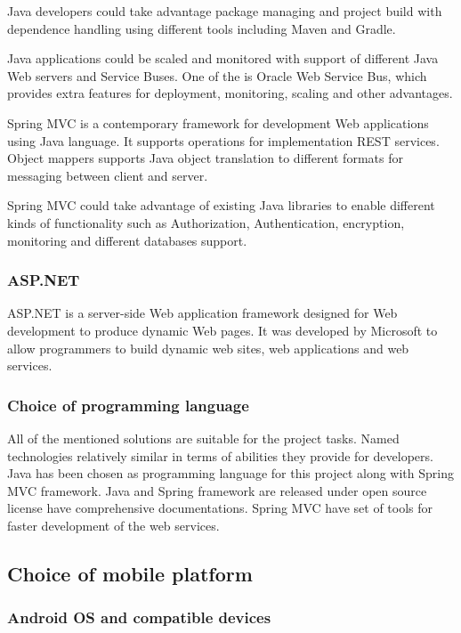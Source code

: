 \documentclass[thesis=M,english]{FITthesis}[2012/10/20]
\begin{document}
Java developers could take advantage package managing and project build with dependence handling using different tools including Maven and Gradle.

Java applications could be scaled and monitored with support of different Java Web servers and Service 
Buses. One of the is Oracle Web Service Bus, which provides extra features for deployment, monitoring, scaling and other advantages.

Spring MVC is a contemporary framework for development Web applications using Java language. It supports operations for implementation REST services. Object mappers supports Java object translation to different formats for messaging between client and server.

Spring MVC could take advantage of existing Java libraries to enable different kinds of functionality such as Authorization, Authentication, encryption, monitoring and different databases support.


\subsubsection{ASP.NET}

ASP.NET is a server-side Web application framework designed for Web development to produce dynamic Web pages. It was developed by Microsoft to allow programmers to build dynamic web sites, web applications and web services.

\subsubsection{Choice of programming language}

All of the mentioned solutions are suitable for the project tasks. Named technologies relatively similar in terms of abilities they provide for developers. 
Java has been chosen as programming language for this project along with Spring MVC framework. Java and Spring framework are released under open source license have comprehensive documentations. Spring MVC have set of tools for faster development of the web services.

\subsection{Choice of mobile platform}


\subsubsection{Android OS and compatible devices}
\end{document}
